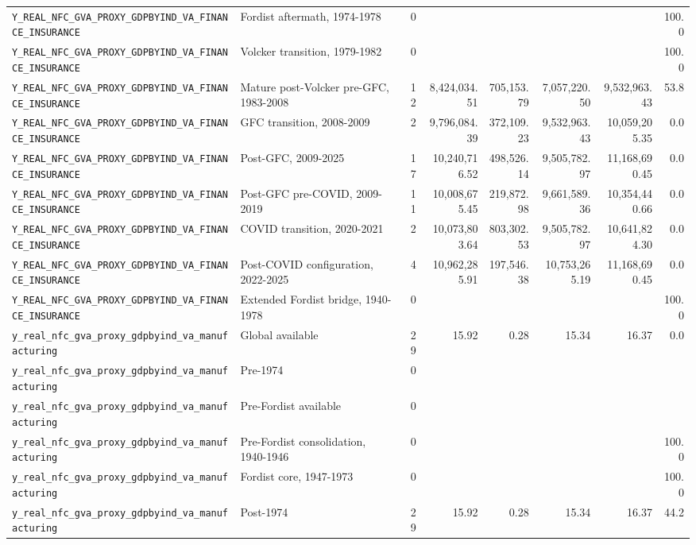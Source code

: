 \begin{landscape}
\begin{longtable}{p{4.4cm}p{3.8cm}rrrrrr}
\\
\nolinkurl{Y_REAL_NFC_GVA_PROXY_GDPBYIND_VA_FINANCE_INSURANCE} & Fordist aftermath, 1974-1978 & 0 &  &  &  &  & 100.0
\\
\nolinkurl{Y_REAL_NFC_GVA_PROXY_GDPBYIND_VA_FINANCE_INSURANCE} & Volcker transition, 1979-1982 & 0 &  &  &  &  & 100.0
\\
\nolinkurl{Y_REAL_NFC_GVA_PROXY_GDPBYIND_VA_FINANCE_INSURANCE} & Mature post-Volcker pre-GFC, 1983-2008 & 12 & 8,424,034.51 & 705,153.79 & 7,057,220.50 & 9,532,963.43 & 53.8
\\
\nolinkurl{Y_REAL_NFC_GVA_PROXY_GDPBYIND_VA_FINANCE_INSURANCE} & GFC transition, 2008-2009 & 2 & 9,796,084.39 & 372,109.23 & 9,532,963.43 & 10,059,205.35 & 0.0
\\
\nolinkurl{Y_REAL_NFC_GVA_PROXY_GDPBYIND_VA_FINANCE_INSURANCE} & Post-GFC, 2009-2025 & 17 & 10,240,716.52 & 498,526.14 & 9,505,782.97 & 11,168,690.45 & 0.0
\\
\nolinkurl{Y_REAL_NFC_GVA_PROXY_GDPBYIND_VA_FINANCE_INSURANCE} & Post-GFC pre-COVID, 2009-2019 & 11 & 10,008,675.45 & 219,872.98 & 9,661,589.36 & 10,354,440.66 & 0.0
\\
\nolinkurl{Y_REAL_NFC_GVA_PROXY_GDPBYIND_VA_FINANCE_INSURANCE} & COVID transition, 2020-2021 & 2 & 10,073,803.64 & 803,302.53 & 9,505,782.97 & 10,641,824.30 & 0.0
\\
\nolinkurl{Y_REAL_NFC_GVA_PROXY_GDPBYIND_VA_FINANCE_INSURANCE} & Post-COVID configuration, 2022-2025 & 4 & 10,962,285.91 & 197,546.38 & 10,753,265.19 & 11,168,690.45 & 0.0
\\
\nolinkurl{Y_REAL_NFC_GVA_PROXY_GDPBYIND_VA_FINANCE_INSURANCE} & Extended Fordist bridge, 1940-1978 & 0 &  &  &  &  & 100.0
\\
\nolinkurl{y_real_nfc_gva_proxy_gdpbyind_va_manufacturing} & Global available & 29 & 15.92 & 0.28 & 15.34 & 16.37 & 0.0
\\
\nolinkurl{y_real_nfc_gva_proxy_gdpbyind_va_manufacturing} & Pre-1974 & 0 &  &  &  &  &
\\
\nolinkurl{y_real_nfc_gva_proxy_gdpbyind_va_manufacturing} & Pre-Fordist available & 0 &  &  &  &  &
\\
\nolinkurl{y_real_nfc_gva_proxy_gdpbyind_va_manufacturing} & Pre-Fordist consolidation, 1940-1946 & 0 &  &  &  &  & 100.0
\\
\nolinkurl{y_real_nfc_gva_proxy_gdpbyind_va_manufacturing} & Fordist core, 1947-1973 & 0 &  &  &  &  & 100.0
\\
\nolinkurl{y_real_nfc_gva_proxy_gdpbyind_va_manufacturing} & Post-1974 & 29 & 15.92 & 0.28 & 15.34 & 16.37 & 44.2

\end{longtable}
\end{landscape}
